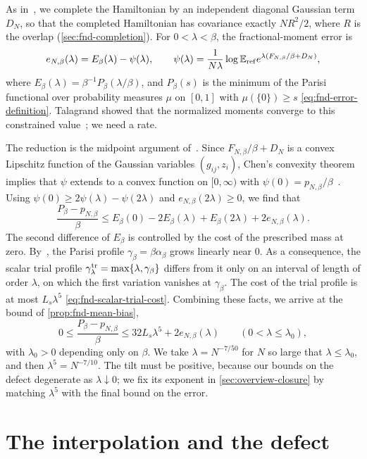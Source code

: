 As in~\cite[Section~1.1]{AL}, we complete the Hamiltonian by an
independent diagonal Gaussian term $D_N$, so that the completed
Hamiltonian has covariance exactly $NR^2/2$, where $R$ is the overlap
(\cref{sec:fnd-completion}). For $0<\lambda<\beta$, the
fractional-moment error is
\[
 e_{N,\beta}(\lambda)=E_\beta(\lambda)-\psi(\lambda),\qquad
 \psi(\lambda)=\frac1{N\lambda}\log\mathbb E_{\rm ref}
 e^{\lambda(F_{N,\beta}/\beta+D_N)},
\]
where $E_\beta(\lambda)=\beta^{-1}P_\beta(\lambda/\beta)$, and
$P_\beta(s)$ is the minimum of the Parisi functional over probability
measures $\mu$ on $[0,1]$ with $\mu(\{0\})\ge s$
\eqref{eq:fnd-error-definition}. Talagrand showed that the normalized
moments converge to this constrained
value~\cite{Talagrand2007FractionalMoments}; we need a rate.

The reduction is the midpoint argument of~\cite[Theorem~7.8,
Step~1]{AL}. Since $F_{N,\beta}/\beta+D_N$ is a convex Lipschitz function
of the Gaussian variables $(g_{ij},z_i)$, Chen's convexity
theorem~\cite[Theorem~1]{ChenConvexity} implies that $\psi$ extends to
a convex function on $[0,\infty)$ with
$\psi(0)=p_{N,\beta}/\beta$~\cite[Lemma~5.2]{AL}. Using
$\psi(0)\ge2\psi(\lambda)-\psi(2\lambda)$ and
$e_{N,\beta}(2\lambda)\ge0$, we find that
\[
 \frac{P_\beta-p_{N,\beta}}\beta
 \le E_\beta(0)-2E_\beta(\lambda)+E_\beta(2\lambda)
 +2e_{N,\beta}(\lambda).
\]
The second difference of $E_\beta$ is controlled by the cost of the
prescribed mass at zero. By~\cite[Lemma~7.2]{AL}, the Parisi profile
$\gamma_\beta=\beta\alpha_\beta$ grows linearly near $0$. As a consequence,
the scalar trial profile $\gamma^{\rm tr}_\lambda=\max\{\lambda,\gamma_\beta\}$
differs from it only on an interval of length of order $\lambda$, on
which the first variation vanishes at $\gamma_\beta$. The cost of the
trial profile is at most $L_s\lambda^5$
\eqref{eq:fnd-scalar-trial-cost}. Combining these facts, we arrive at
the bound of \cref{prop:fnd-mean-bias},
\[
 0\le\frac{P_\beta-p_{N,\beta}}\beta\le32L_s\lambda^5
 +2e_{N,\beta}(\lambda)\qquad(0<\lambda\le\lambda_0),
\]
with $\lambda_0>0$ depending only on $\beta$. We take
$\lambda=N^{-7/50}$ for $N$ so large that $\lambda\le\lambda_0$, and
then $\lambda^5=N^{-7/10}$. The tilt must be positive, because our
bounds on the defect degenerate as $\lambda\downarrow0$; we fix its exponent
in \cref{sec:overview-closure} by matching $\lambda^5$ with the
final bound on the error.

\section{The interpolation and the defect}
\label{sec:overview-interpolation}

